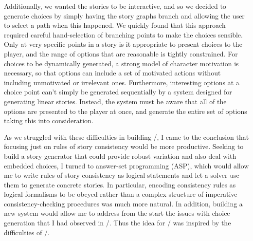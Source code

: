 Additionally, we wanted the stories to be interactive, and so we decided to generate choices by simply having the story graphs branch and allowing the user to select a path when this happened.
%
We quickly found that this approach required careful hand-selection of branching points to make the choices sensible.
%
Only at very specific points in a story is it appropriate to present choices to the player, and the range of options that are reasonable is tightly constrained.
%
For choices to be dynamically generated, a strong model of character motivation is necessary, so that options can include a set of motivated actions without including unmotivated or irrelevant ones.
%
Furthermore, interesting options at a choice point can't simply be generated sequentially by a system designed for generating linear stories.
%
Instead, the system must be aware that all of the options are presented to the player at once, and generate the entire set of options taking this into consideration.


As we struggled with these difficulties in building \problemplanets/, I came to the conclusion that focusing just on rules of story consistency would be more productive.
%
Seeking to build a story generator that could provide robust variation and also deal with embedded choices, I turned to answer-set programming (ASP), which would allow me to write rules of story consistency as logical statements and let a solver use them to generate concrete stories.
%
In particular, encoding consistency rules as logical formalisms to be obeyed rather than a complex structure of imperative consistency-checking procedures was much more natural.
%
In addition, building a new system would allow me to address from the start the issues with choice generation that I had observed in \problemplanets/.
%
Thus the idea for \dunyazad/ was inspired by the difficulties of \problemplanets/.
